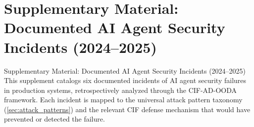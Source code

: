 \documentclass[
  ignorenonframetext,
]{beamer}
\author{\texorpdfstring{}{}}
\date{}
\begin{document}
\section{Supplementary Material: Documented AI Agent Security Incidents
(2024--2025)}\label{sec:empirical_grounding}

\begin{frame}[allowframebreaks]{Supplementary Material: Documented AI
Agent Security Incidents (2024--2025)}
This supplement catalogs six documented incidents of AI agent security
failures in production systems, retrospectively analyzed through the
CIF-AD-OODA framework. Each incident is mapped to the universal attack
pattern taxonomy (\cref{sec:attack_patterns}) and the relevant CIF
defense mechanism that would have prevented or detected the failure.
\end{frame}
\end{document}
